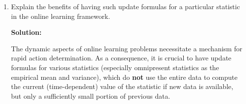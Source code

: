 \documentclass[a4paper]{article}
\begin{document}
{\begin{enumerate}
	Note that 
%	
	\begin{align*}
%		
		v_s &=  \frac1s \sum_{j=1}^s (z_j-\bar{z}_{s})^\top (z_j-\bar{z}_{s}) \\
%		
		&=  \frac1s \sum_{j=1}^s z_j^\top z_j - 2 \bar{z}_{s}^\top z_j +  \bar{z}_{s}^\top \bar{z}_{s} \\
%		
		&=  \frac1s \sum_{j=1}^s z_j^\top z_j - \frac2s \bar{z}_{s}^\top \sum_{j=1}^s  z_j +  \bar{z}_{s}^\top \bar{z}_{s} \\
%		
		&=  \overline{z^2_{s}} - \bar{z}_{s}^\top \bar{z}_{s}.
%		
	\end{align*}
%	
	Since $\overline{z^2_{s}}$ is essentially an empirical average (of inner products), we can use almost the same update function as for the empirical mean in (a): 
%	
	\begin{align*}
%		
		\overline{z^2_{s}} = u_1(\overline{z^2_{s-1}},z_s,s),
%		
	\end{align*}
	where $u_1(a,b,c) =  \frac1c (   (c-1) a + b^\top b ).$
%	
	For $\bar{z}_{s}^\top \bar{z}_{s}$ we can use the update function for the mean by computing the inner product of the two update functions:
%	
	\begin{align*}
%		
		\bar{z}_{s}^\top \bar{z}_{s} = \left( u_2(\bar{z}_{s-1},z_s,s) \right)^\top u_2(\bar{z}_{s-1},z_s,s),
%		
	\end{align*}
%
  where $u_2(a,b,c) =  \frac1c (   (c-1) a + b ).$
%
	Combining everything together yields
%	
	\begin{align*}
%		
		v_s = \overline{z^2_{s}} - \bar{z}_{s}^\top \bar{z}_{s} = u_1(\overline{z^2_{s-1}},z_s,s) - \left( u_2(\bar{z}_{s-1},z_s,s) \right)^\top u_2(\bar{z}_{s-1},z_s,s) =:u(\overline{z^2_{s-1}},\bar{z}_{s-1},z_{s},s),
%		
	\end{align*}
%
	where $u(a,b,c,s) = u_1(a,c,s) - \left( u_2(b,c,s) \right)^\top u_2(b,c,s).$
	
	
	\item  Explain the benefits of having such update formulas for a particular statistic in the online learning framework.
	
	\textbf{Solution:}
	
	The dynamic aspects of online learning problems necessitate a mechanism for rapid action determination.  As a consequence, it is crucial to have update formulas for various statistics (especially omnipresent statistics as the empirical mean and variance), which do \textbf{not} use the entire data to compute the current (time-dependent) value of the statistic if new data is available, but only a sufficiently small portion of previous data.
	
\end{enumerate}

}
\end{document}
